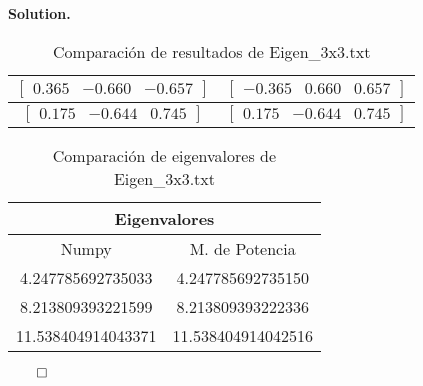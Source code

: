\documentclass{article}
\theoremstyle{problemstyle}
\newenvironment{solution}{%
  \begin{mdframed}[linewidth=0.8pt,linecolor=Gray,backgroundcolor=Gray!5,roundcorner=5pt]%
  \noindent\textbf{Solution.}%
}{%
\hfill $ \qed $ 
  \end{mdframed}%
}
\begin{document}
\begin{solution}
\begin{enumerate}
\begin{table}[H]
\begin{center}
\begin{tabular}{|c|c|}
					      \rule{0pt}{1.5em}
					      $ \begin{bmatrix}
							        0.365 & -0.660 & -0.657
						        \end{bmatrix} $  & $ \begin{bmatrix}
							                             -0.365 & 0.660 & 0.657
						                             \end{bmatrix} $  \\
					      [0.5em]
					      \hline
					      \rule{0pt}{1.5em}
					      $ \begin{bmatrix}
							        0.175 & -0.644 & 0.745
						        \end{bmatrix} $   & $ \begin{bmatrix}
							                              0.175 & -0.644 & 0.745
						                              \end{bmatrix} $ \\
					      [0.5em]
					      \hline
				      \end{tabular}

			      \end{center}
			      \caption{Comparaci\'on de resultados de Eigen\_3x3.txt}\label{tab:invevecs3x3}
		      \end{table}

		      \begin{table}[H]
			      \begin{center}
				      \begin{tabular}{|c|c|}
					      \multicolumn{2}{c}{Eigenvalores}        \\
					      \hline
					      Numpy              & M. de Potencia     \\
					      \hline

					      4.247785692735033  & 4.247785692735150  \\
					      \hline
					      8.213809393221599  & 8.213809393222336  \\
					      \hline
					      11.538404914043371 & 11.538404914042516 \\
					      \hline
				      \end{tabular}
			      \end{center}
			      \caption{Comparaci\'on de eigenvalores de Eigen\_3x3.txt}\label{tab:invevals3x3}
		      \end{table}



\end{enumerate}
\end{solution}
\end{document}
